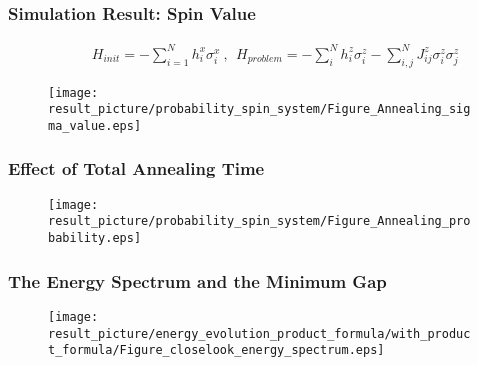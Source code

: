 \documentclass{beamer}
\begin{document}
\begin{frame}
	\frametitle{Simulation Result: Spin Value}
		\begin{equation*}
		\begin{split}
		~~~~~~~~~~H_{init}= -\sum_{i=1}^{N}h_i^x \sigma_i^x ~,~~ H_{problem}= -\sum_{i}^N h_i^z \sigma^z_i  -\sum_{i,j}^N J_{ij}^z \sigma^z_i \sigma^z_j
		\end{split}
		\end{equation*} 
	\begin{figure}
		\centering
		\texttt{[image: result\_picture/probability\_spin\_system/Figure\_Annealing\_sigma\_value.eps]}
	\end{figure}
\end{frame}

\begin{frame}
	\frametitle{Effect of Total Annealing Time}
	\begin{figure}
		\centering
		\texttt{[image: result\_picture/probability\_spin\_system/Figure\_Annealing\_probability.eps]}
		
	\end{figure}
\end{frame}

%		

\begin{frame}
	\frametitle{The Energy Spectrum and the Minimum Gap}
	\begin{figure}
		\centering
		\texttt{[image: result\_picture/energy\_evolution\_product\_formula/with\_product\_formula/Figure\_closelook\_energy\_spectrum.eps]}
		
	\end{figure}
\end{frame}
\end{document}
